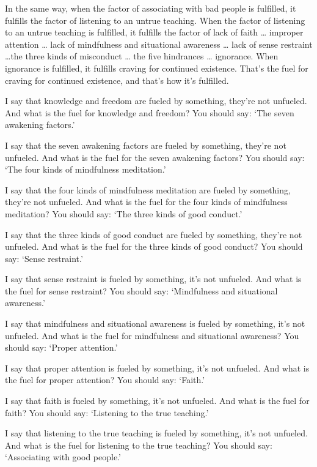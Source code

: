 \documentclass[12pt,openany]{book}%
\begin{document}
In the same way, when the factor of associating with bad people is fulfilled, it fulfills the factor of listening to an untrue teaching. When the factor of listening to an untrue teaching is fulfilled, it fulfills the factor of lack of faith … improper attention … lack of mindfulness and situational awareness … lack of sense restraint …the three kinds of misconduct … the five hindrances … ignorance. When ignorance is fulfilled, it fulfills craving for continued existence. That’s the fuel for craving for continued existence, and that’s how it’s fulfilled. 

I say that knowledge and freedom are fueled by something, they’re not unfueled. And what is the fuel for knowledge and freedom? You should say: ‘The seven awakening factors.’ 

I say that the seven awakening factors are fueled by something, they’re not unfueled. And what is the fuel for the seven awakening factors? You should say: ‘The four kinds of mindfulness meditation.’ 

I say that the four kinds of mindfulness meditation are fueled by something, they’re not unfueled. And what is the fuel for the four kinds of mindfulness meditation? You should say: ‘The three kinds of good conduct.’ 

I say that the three kinds of good conduct are fueled by something, they’re not unfueled. And what is the fuel for the three kinds of good conduct? You should say: ‘Sense restraint.’ 

I say that sense restraint is fueled by something, it’s not unfueled. And what is the fuel for sense restraint? You should say: ‘Mindfulness and situational awareness.’ 

I say that mindfulness and situational awareness is fueled by something, it’s not unfueled. And what is the fuel for mindfulness and situational awareness? You should say: ‘Proper attention.’ 

I say that proper attention is fueled by something, it’s not unfueled. And what is the fuel for proper attention? You should say: ‘Faith.’ 

I say that faith is fueled by something, it’s not unfueled. And what is the fuel for faith? You should say: ‘Listening to the true teaching.’ 

I say that listening to the true teaching is fueled by something, it’s not unfueled. And what is the fuel for listening to the true teaching? You should say: ‘Associating with good people.’ 
\end{document}
